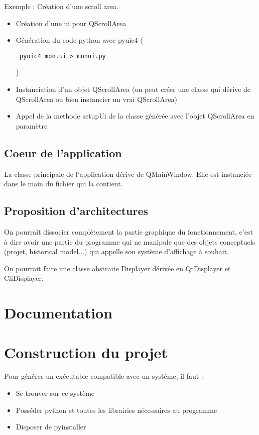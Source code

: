 \documentclass[12pt,a4paper]{article}
\begin{document}
        Exemple : Création d'une scroll area.
        \begin{itemize}
            \item Création d'une ui pour QScrollArea
            \item Génération du code python avec pyuic4 (\begin{verbatim} pyuic4 mon.ui > monui.py \end{verbatim})
            \item Instanciation d'un objet QScrollArea (on peut créer une classe qui dérive de QScrollArea ou bien instancier un vrai QScrollArea)
            \item Appel de la methode setupUi de la classe générée avec l'objet QScrollArea en paramètre
        \end{itemize}
    \subsection{Coeur de l'application}
        La classe principale de l'application dérive de QMainWindow. Elle est instanci\'ee dans le main du fichier qui la contient.


    \subsection{Proposition d'architectures}
        On pourrait dissocier complètement la partie graphique du fonctionnement, c'est à dire avoir une partie du programme
        qui ne manipule que des objets conceptuels (projet, historical model...) qui appelle son système d'affichage à souhait.

        On pourrait faire une classe abstraite Displayer dérivée en QtDisplayer et CliDisplayer.


\section{Documentation}

\section{Construction du projet}
    Pour générer un exécutable compatible avec un système, il faut : 
    \begin{itemize}
    \item Se trouver sur ce système
    \item Posséder python et toutes les librairies nécessaires au programme
    \item Disposer de pyinstaller
    \end{itemize}
    
\end{document}

